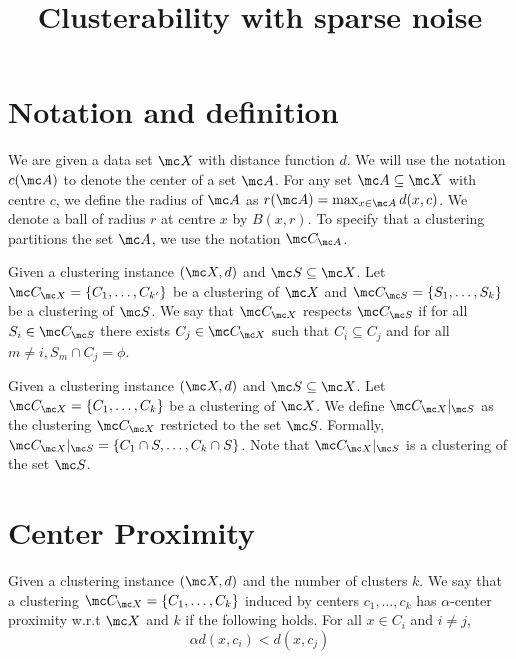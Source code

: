\documentclass[11pt]{article}
\title{\LARGE Clusterability with sparse noise}
\author{}
\begin{document}
\maketitle

\section{Notation and definition}
We are given a data set $\mc X$ with distance function $d$.  We will use the notation $c(\mc A)$ to denote the center of a set $\mc A$. For any set $\mc A\subseteq \mc X$ with centre $c$, we define the radius of $\mc A$ as $r(\mc A) = \max_{x \in \mc A} d(x, c)$. We denote a ball of radius $r$ at centre $x$ by $B(x, r)$. To specify that a clustering partitions the set $\mc A$, we use the notation $\mc C_{\mc A}$.

\begin{definition}[$\mc C_{\mc X}$ respects $\mc C_{\mc S}$] Given a clustering instance $(\mc X, d)$ and $\mc S \subseteq \mc X$. Let $\mc C_{\mc X} = \{C_1, \ldots, C_{k'}\}$ be a clustering of $\mc X$ and $\mc C_{\mc S} = \{S_1, \ldots, S_k\}$ be a clustering of $\mc S$. We say that $\mc C_{\mc X}$ respects $\mc C_{\mc S}$ if for all $S_i \in \mc C_{\mc S}$ there exists $C_j \in \mc C_{\mc X}$ such that $C_i \subseteq C_j$ and for all $m \neq i, S_m \cap C_j = \phi$.
\label{defn:cxrespectscs}
\end{definition}

\begin{definition}[$\mc C_{\mc X}$ restricted to $\mc S$] Given a clustering instance $(\mc X, d)$ and $\mc S \subseteq \mc X$. Let $\mc C_{\mc X} = \{C_1, \ldots, C_k\}$ be a clustering of $\mc X$. We define $\mc C_{\mc X}|_{\mc S}$ as the clustering $\mc C_{\mc X}$ restricted to the set $\mc S$. Formally, $\mc C_{\mc X}|_{\mc S} = \{C_1 \cap S, \ldots, C_k \cap S\}$. Note that $\mc C_{\mc X}|_{\mc S}$ is a clustering of the set $\mc S$. 
\end{definition}

\section{Center Proximity}
\begin{definition}
\label{defn:alphacp}
Given a clustering instance $(\mc X, d)$ and the number of clusters $k$. We say that a clustering $\mc C_{\mc X} = \{C_1, \ldots, C_k\}$ induced by centers $c_1, \ldots, c_k$ has $\alpha$-center proximity w.r.t $\mc X$ and $k$ if the following holds. For all $x \in C_i$ and $i\neq j$, 
$$\alpha d(x, c_i) < d(x, c_j)$$
\end{definition}
\end{document}
